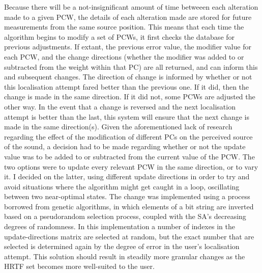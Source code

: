 Because there will be a not-insignificant amount of time betweeen each alteration made to a given PCW, the details of each alteration made are stored for future measurements from the same source position. This means that each time the algorithm begins to modify a set of PCWs, it first checks the database for previous adjustments. If extant, the previous error value, the modifier value for each PCW, and the change directions (whether the modifier was added to or subtracted from the weight within that PC) are all returned, and can inform this and subsequent changes. The direction of change is informed by whether or not this localisation attempt fared better than the previous one. If it did, then the change is made in the same direction. If it did not, some PCWs are adjusted the other way. In the event that a change is reversed and the next localisation attempt is better than the last, this system will ensure that the next change is made in the same direction(s). Given the aforementioned lack of research regarding the effect of the modification of different PCs on the perceived source of the sound, a decision had to be made regarding whether or not the update value was to be added to or subtracted from the current value of the PCW. The two options were to update every relevant PCW in the same direction, or to vary it. I decided on the latter, using different update directions in order to try and avoid situations where the algorithm might get caught in a loop, oscillating between two near-optimal states. The change was implemented using a process borrowed from genetic algorithms\citep{Whitley1994}, in which elements of a bit string are inverted based on a pseudorandom selection  process, coupled with the SA's decreasing degrees of randomness. In this implementation a number of indexes in the update-directions matrix are selected at random, but the exact number that are selected is determined again by the degree of error in the user's localisation attempt. This solution should result in steadily more granular changes as the HRTF set becomes more well-suited to the user. 

